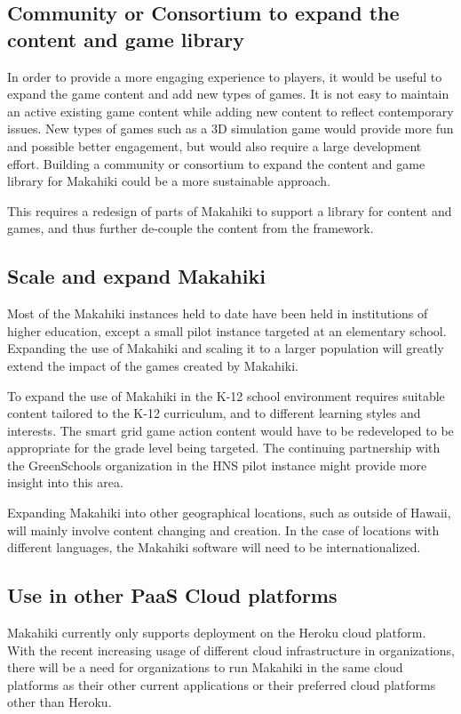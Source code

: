 \subsection{Community or Consortium to expand the content and game library}

In order to provide a more engaging experience to players, it would be useful to expand the game content and add new types of games. It is not easy to maintain an active existing game content while adding new content to reflect contemporary issues. New types of games such as a 3D simulation game would provide more fun and possible better engagement, but would also require a large development effort. Building a community or consortium to expand the content and game library for Makahiki could be a more sustainable approach. 

This requires a redesign of parts of Makahiki to support a library for content and games, and thus further de-couple the content from the framework.

\subsection{Scale and expand Makahiki}

Most of the Makahiki instances held to date have been held in institutions of higher education, except a small pilot instance targeted at an elementary school. Expanding the use of Makahiki and scaling it to a larger population will greatly extend the impact of the games created by Makahiki.

To expand the use of Makahiki in the K-12 school environment requires suitable content tailored to the K-12 curriculum, and to different learning styles and interests. The smart grid game action content would have to be redeveloped to be appropriate for the grade level being targeted. The continuing partnership with the GreenSchools organization in the HNS pilot instance might provide more insight into this area.

Expanding Makahiki into other geographical locations, such as outside of Hawaii, will mainly involve content changing and creation. In the case of locations with different languages, the Makahiki software will need to be internationalized. 

\subsection{Use in other PaaS Cloud platforms}
Makahiki currently only supports deployment on the Heroku cloud platform. With the recent increasing usage of different cloud infrastructure in organizations, there will be a need for organizations to run Makahiki in the same cloud platforms as their other current  applications or their preferred cloud platforms other than Heroku. 

